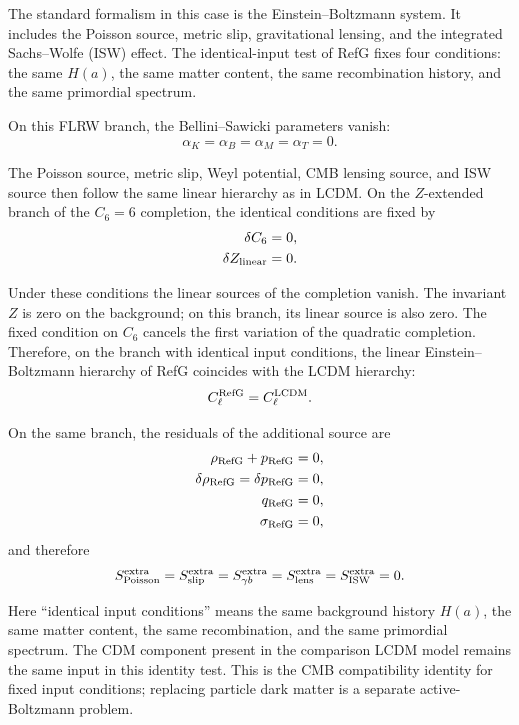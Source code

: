 \documentclass[12pt]{article}
\begin{document}
The standard formalism in this case is the Einstein--Boltzmann system. It includes the Poisson source, metric slip, gravitational lensing, and the integrated Sachs--Wolfe (ISW) effect. The identical-input test of RefG fixes four conditions: the same $H(a)$, the same matter content, the same recombination history, and the same primordial spectrum.

On this FLRW branch, the Bellini--Sawicki parameters vanish:
\begin{equation}
\alpha_K=\alpha_B=\alpha_M=\alpha_T=0 .
\end{equation}

The Poisson source, metric slip, Weyl potential, CMB lensing source, and ISW source then follow the same linear hierarchy as in LCDM. On the $Z$-extended branch of the $C_6=6$ completion, the identical conditions are fixed by
\begin{align}
\delta C_6 &= 0, \\
\delta Z_{\rm linear} &= 0 .
\end{align}

Under these conditions the linear sources of the completion vanish. The invariant $Z$ is zero on the background; on this branch, its linear source is also zero. The fixed condition on $C_6$ cancels the first variation of the quadratic completion. Therefore, on the branch with identical input conditions, the linear Einstein--Boltzmann hierarchy of RefG coincides with the LCDM hierarchy:
\begin{equation}
C_\ell^{\rm RefG}=C_\ell^{\rm LCDM}.
\end{equation}

On the same branch, the residuals of the additional source are
\begin{align}
\rho_{\rm RefG}+p_{\rm RefG} &= 0, \\
\delta\rho_{\rm RefG}=\delta p_{\rm RefG} &= 0, \\
q_{\rm RefG} &= 0, \\
\sigma_{\rm RefG} &= 0,
\end{align}
and therefore
\begin{equation}
S_{\rm Poisson}^{\rm extra}
=S_{\rm slip}^{\rm extra}
=S_{\gamma b}^{\rm extra}
=S_{\rm lens}^{\rm extra}
=S_{\rm ISW}^{\rm extra}
=0 .
\end{equation}

Here ``identical input conditions'' means the same background history $H(a)$, the same matter content, the same recombination, and the same primordial spectrum. The CDM component present in the comparison LCDM model remains the same input in this identity test. This is the CMB compatibility identity for fixed input conditions; replacing particle dark matter is a separate active-Boltzmann problem.
\end{document}
